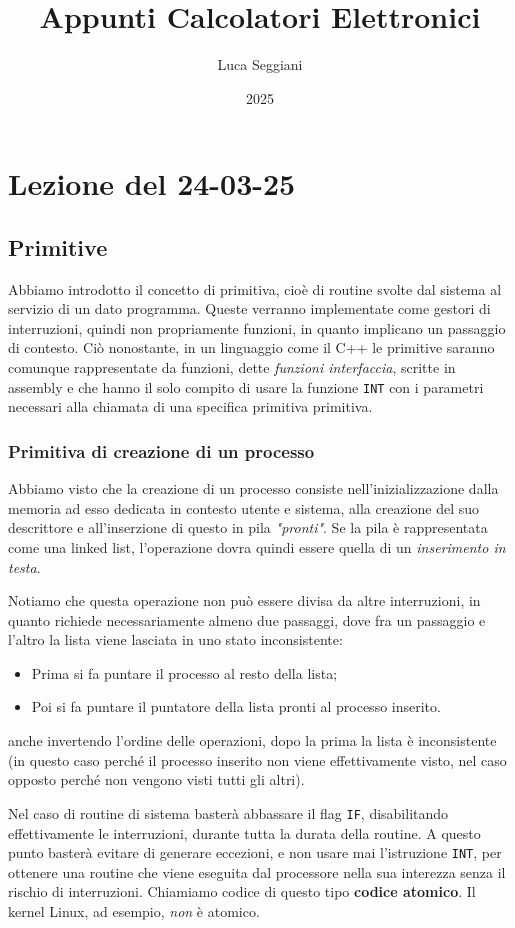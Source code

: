 \documentclass[a4paper,11pt]{article}
\title{Appunti Calcolatori Elettronici}
\author{Luca Seggiani}
\date{2025}
\begin{document}
\section{Lezione del 24-03-25}

\thispagestyle{empty}
\pagestyle{fancy}

\subsection{Primitive}
Abbiamo introdotto il concetto di primitiva, cioè di routine svolte dal sistema al servizio di un dato programma.
Queste verranno implementate come gestori di interruzioni, quindi non propriamente funzioni, in quanto implicano un passaggio di contesto.
Ciò nonostante, in un linguaggio come il C++ le primitive saranno comunque rappresentate da funzioni, dette \textit{funzioni interfaccia}, scritte in assembly e che hanno il solo compito di usare la funzione \lstinline|INT| con i parametri necessari alla chiamata di una specifica primitiva primitiva.

\subsubsection{Primitiva di creazione di un processo}
Abbiamo visto che la creazione di un processo consiste nell'inizializzazione dalla memoria ad esso dedicata in contesto utente e sistema, alla creazione del suo descrittore e all'inserzione di questo in pila \textit{"pronti"}.
Se la pila è rappresentata come una linked list, l'operazione dovra quindi essere quella di un \textit{inserimento in testa}.

Notiamo che questa operazione non può essere divisa da altre interruzioni, in quanto richiede necessariamente almeno due passaggi, dove fra un passaggio e l'altro la lista viene lasciata in uno stato inconsistente:
\begin{itemize}
	\item Prima si fa puntare il processo al resto della lista;
	\item Poi si fa puntare il puntatore della lista pronti al processo inserito.
\end{itemize}
anche invertendo l'ordine delle operazioni, dopo la prima la lista è inconsistente (in questo caso perché il processo inserito non viene effettivamente visto, nel caso opposto perché non vengono visti tutti gli altri).

Nel caso di routine di sistema basterà abbassare il flag \lstinline|IF|, disabilitando effettivamente le interruzioni, durante tutta la durata della routine.
A questo punto basterà evitare di generare eccezioni, e non usare mai l'istruzione \lstinline|INT|, per ottenere una routine che viene eseguita dal processore nella sua interezza senza il rischio di interruzioni.
Chiamiamo codice di questo tipo \textbf{codice atomico}.
Il kernel Linux, ad esempio, \textit{non} è atomico.
\end{document}
